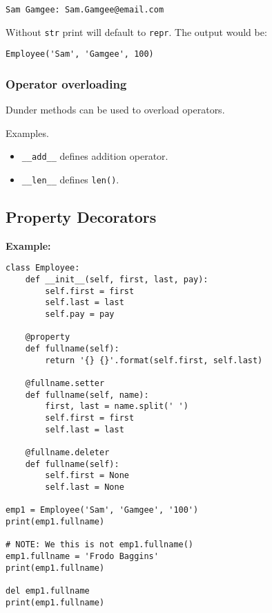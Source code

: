\vfill\null
\columnbreak

\begin{mdframed}[backgroundcolor=magenta!10,linecolor=magenta,nobreak=true]
\begin{verbatim}
Sam Gamgee: Sam.Gamgee@email.com
\end{verbatim}
\end{mdframed}


Without \texttt{str} print will default to \texttt{repr}. The output would be:\\

\begin{mdframed}[backgroundcolor=magenta!10,linecolor=magenta]
\begin{verbatim}
Employee('Sam', 'Gamgee', 100) 
\end{verbatim}
\end{mdframed}


\subsubsection*{Operator overloading}

Dunder methods can be used to overload operators.

Examples.\\

\begin{itemize}
\item \texttt{\_\_add\_\_} defines addition operator.
\item \texttt{\_\_len\_\_} defines \texttt{len()}.
\end{itemize}

\subsection*{Property Decorators}

\textbf{Example:}

\begin{mdframed}[backgroundcolor=gray!10,linecolor=Firebrick4]
\begin{verbatim}
class Employee:
    def __init__(self, first, last, pay):
        self.first = first
        self.last = last
        self.pay = pay
    
    @property
    def fullname(self):
        return '{} {}'.format(self.first, self.last)

    @fullname.setter
    def fullname(self, name):
        first, last = name.split(' ')
        self.first = first
        self.last = last

    @fullname.deleter
    def fullname(self):
        self.first = None
        self.last = None

emp1 = Employee('Sam', 'Gamgee', '100')
print(emp1.fullname)

# NOTE: We this is not emp1.fullname()
emp1.fullname = 'Frodo Baggins'
print(emp1.fullname)

del emp1.fullname
print(emp1.fullname)
\end{verbatim}
\end{mdframed}


